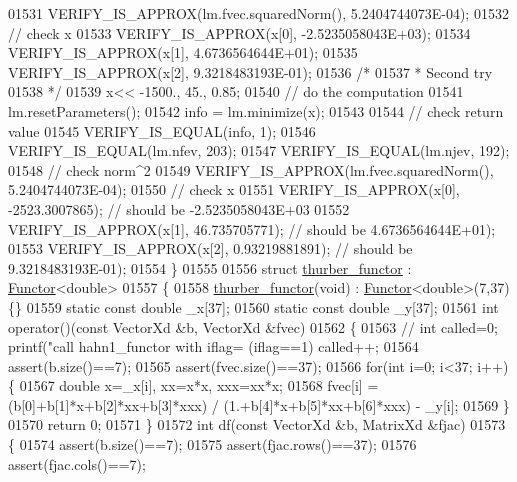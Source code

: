 \begin{DoxyCode}
01531   VERIFY\_IS\_APPROX(lm.fvec.squaredNorm(), 5.2404744073E-04);
01532   \textcolor{comment}{// check x}
01533   VERIFY\_IS\_APPROX(x[0], -2.5235058043E+03);
01534   VERIFY\_IS\_APPROX(x[1], 4.6736564644E+01);
01535   VERIFY\_IS\_APPROX(x[2], 9.3218483193E-01);
01536   \textcolor{comment}{/*}
01537 \textcolor{comment}{   * Second try}
01538 \textcolor{comment}{   */}
01539   x<< -1500., 45., 0.85;
01540   \textcolor{comment}{// do the computation}
01541   lm.resetParameters();
01542   info = lm.minimize(x);
01543 
01544   \textcolor{comment}{// check return value}
01545   VERIFY\_IS\_EQUAL(info, 1);
01546   VERIFY\_IS\_EQUAL(lm.nfev, 203);
01547   VERIFY\_IS\_EQUAL(lm.njev, 192);
01548   \textcolor{comment}{// check norm^2}
01549   VERIFY\_IS\_APPROX(lm.fvec.squaredNorm(), 5.2404744073E-04);
01550   \textcolor{comment}{// check x}
01551   VERIFY\_IS\_APPROX(x[0], -2523.3007865); \textcolor{comment}{// should be -2.5235058043E+03}
01552   VERIFY\_IS\_APPROX(x[1], 46.735705771); \textcolor{comment}{// should be 4.6736564644E+01);}
01553   VERIFY\_IS\_APPROX(x[2], 0.93219881891); \textcolor{comment}{// should be 9.3218483193E-01);}
01554 \}
01555 
01556 \textcolor{keyword}{struct }\hyperlink{structthurber__functor}{thurber\_functor} : \hyperlink{struct_functor}{Functor}<double>
01557 \{
01558     \hyperlink{structthurber__functor}{thurber\_functor}(\textcolor{keywordtype}{void}) : \hyperlink{struct_functor}{Functor}<double>(7,37) \{\}
01559     \textcolor{keyword}{static} \textcolor{keyword}{const} \textcolor{keywordtype}{double} \_x[37];
01560     \textcolor{keyword}{static} \textcolor{keyword}{const} \textcolor{keywordtype}{double} \_y[37];
01561     \textcolor{keywordtype}{int} operator()(\textcolor{keyword}{const} VectorXd &b, VectorXd &fvec)
01562     \{
01563         \textcolor{comment}{//        int called=0; printf("call hahn1\_functor with  iflag=%
       (iflag==1) called++;}
01564         assert(b.size()==7);
01565         assert(fvec.size()==37);
01566         \textcolor{keywordflow}{for}(\textcolor{keywordtype}{int} i=0; i<37; i++) \{
01567             \textcolor{keywordtype}{double} x=\_x[i], xx=x*x, xxx=xx*x;
01568             fvec[i] = (b[0]+b[1]*x+b[2]*xx+b[3]*xxx) / (1.+b[4]*x+b[5]*xx+b[6]*xxx) - \_y[i];
01569         \}
01570         \textcolor{keywordflow}{return} 0;
01571     \}
01572     \textcolor{keywordtype}{int} df(\textcolor{keyword}{const} VectorXd &b, MatrixXd &fjac)
01573     \{
01574         assert(b.size()==7);
01575         assert(fjac.rows()==37);
01576         assert(fjac.cols()==7);

\end{DoxyCode}
